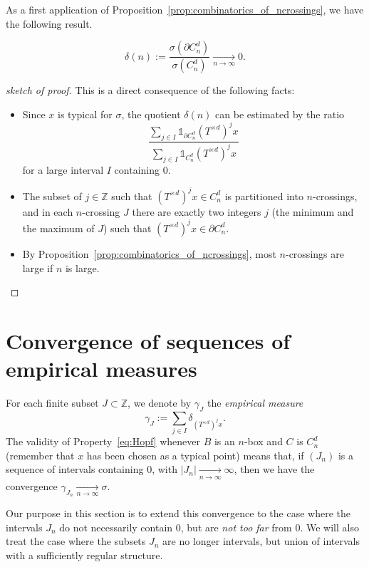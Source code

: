 \documentclass[10pt]{amsart}
\theoremstyle{definition}\newtheorem{defi}[theo]{Definition}\newtheorem{rema}[theo]{Remark}\newtheorem{exam}[theo]{Example}\newtheorem{exem}[theo]{Example}\newtheorem{nota}[theo]{Notation}
\newcommand{\egdef}{:=}
\newcommand{\tend}[3][]{\xrightarrow[#2\to#3]{#1}}
\newcommand{\ind}[1]{\mathds{1}_{#1}}
\newcommand{\ZZ}{\mathbb{Z}}
\newcommand{\cd}{C^{d}}
\newcommand{\td}{T^{\times d}}
\begin{document}
As a first application of Proposition~\ref{prop:combinatorics_of_ncrossings}, we have the following result.

\begin{coro}\label{cor:edge}%
\[
\delta(n)\egdef \dfrac{\sigma(\partial \cd_n)}{\sigma(\cd_n)} \tend{n}{\infty} 0.
\]
\end{coro}

\begin{proof}[sketch of proof]
This is a direct consequence of the following facts:
\begin{itemize}
\item Since $x$ is typical for $\sigma$, the quotient $\delta(n)$ can be estimated by the ratio
\[
\dfrac{\sum_{j\in I}\ind{\partial \cd_n} (\td)^j x}{\sum_{j\in I}\ind{\cd_n} (\td)^j x}
\]
for a large interval $I$ containing 0.
\item The subset of $j\in \ZZ$ such that $(\td)^jx\in \cd_n$ is partitioned into $n$-crossings, and in each $n$-crossing $J$ there are exactly two integers $j$ (the minimum and the maximum of $J$) such that $(\td)^jx\in\partial\cd_n$.
\item By Proposition~\ref{prop:combinatorics_of_ncrossings}, most $n$-crossings are large if $n$ is large.\qedhere
\end{itemize}
\end{proof}



\section{Convergence of sequences of empirical measures}\label{sec:convergence}
For each finite subset $J\subset\ZZ$, we denote by $\gamma_J$ the \emph{empirical measure}
\[
\gamma_J \egdef \sum_{j\in I} \delta_{(\td)^j x}.
\]
The validity of Property~\eqref{eq:Hopf} whenever $B$ is an $n$-box and $C$ is $\cd_n$ (remember that $x$ has been chosen as a typical point) means that, if $(J_n)$ is a sequence of intervals containing $0$, with $|J_n|\tend{n}{\infty}\infty$, then we have the convergence $\gamma_{J_n}\tend{n}{\infty} \sigma$.

Our purpose in this section is to extend this convergence to the case where the intervals $J_n$ do not necessarily contain 0, but are \emph{not too far} from 0. We will also treat the case where the subsets $J_n$ are no longer intervals, but union of intervals with a sufficiently regular structure.
\end{document}
